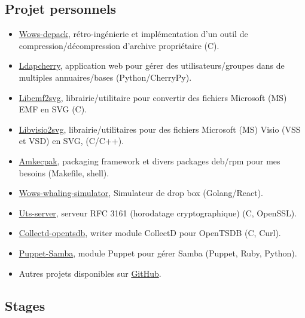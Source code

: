 \documentclass[10pt,a4paper,sans]{moderncv}        %
\begin{document}
\subsection{Projet personnels}
        {}
        {}
        {}
        {
            \begin{itemize}
            \item \href{https://github.com/wows-tools/wows-depack}{Wows-depack}, rétro-ingénierie et implémentation d'un outil de compression/décompression d'archive propriétaire (C).
            \item \href{https://github.com/kakwa/ldapcherry}{Ldapcherry}, application web pour gérer des utilisateurs/groupes dans de multiples annuaires/bases (Python/CherryPy).
            \item \href{https://github.com/kakwa/libemf2svg}{Libemf2svg}, librairie/utilitaire pour convertir des fichiers Microsoft (MS) EMF en SVG (C).
            \item \href{https://github.com/kakwa/libvisio2svg}{Libvisio2svg}, librairie/utilitaires pour des fichiers Microsoft (MS) Visio (VSS et VSD) en SVG, (C/C++).
            \item \href{https://github.com/kakwa/amkecpak}{Amkecpak}, packaging framework et divers packages deb/rpm pour mes besoins (Makefile, shell).
            \item \href{https://github.com/wows-tools/wows-whaling-simulator}{Wows-whaling-simulator}, Simulateur de drop box (Golang/React).
            \item \href{https://github.com/kakwa/uts-server}{Uts-server}, serveur RFC 3161 (horodatage cryptographique) (C, OpenSSL).
            \item \href{https://github.com/kakwa/collectd-opentsdb}{Collectd-opentsdb}, writer module CollectD pour OpenTSDB (C, Curl).
            \item \href{https://github.com/kakwa/puppet-samba}{Puppet-Samba}, module Puppet pour gérer Samba (Puppet, Ruby, Python).
            \item Autres projets disponibles sur \href{https://github.com/kakwa?tab=repositories&q=&type=&language=&sort=stargazers}{GitHub}.
            \end{itemize}
        }

\subsection{Stages}
\end{document}
